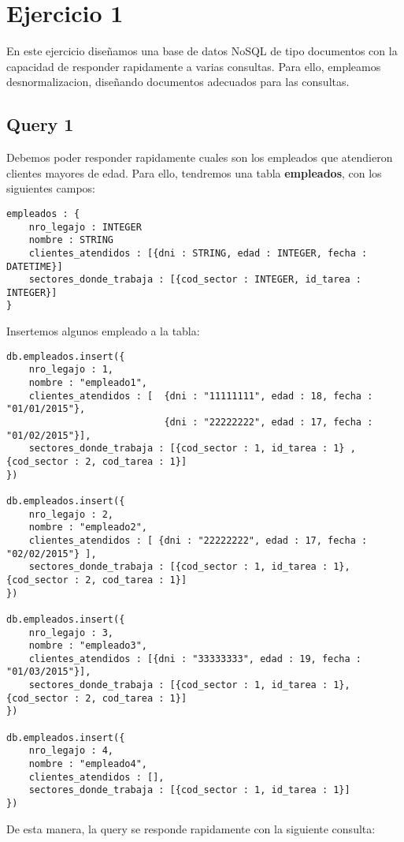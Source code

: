 \section{Ejercicio 1}

En este ejercicio diseñamos una base de datos NoSQL de tipo documentos con la capacidad de responder rapidamente a varias consultas. Para ello, empleamos desnormalizacion, diseñando documentos adecuados para las consultas.

\subsection{Query 1}
Debemos poder responder rapidamente cuales son los empleados que atendieron clientes mayores de edad. Para ello, tendremos una tabla \textbf{empleados}, con los siguientes campos:

\begin{verbatim}
empleados : {
	nro_legajo : INTEGER
	nombre : STRING
	clientes_atendidos : [{dni : STRING, edad : INTEGER, fecha : DATETIME}]
	sectores_donde_trabaja : [{cod_sector : INTEGER, id_tarea : INTEGER}]
}
\end{verbatim}

Insertemos algunos empleado a la tabla:

\begin{verbatim}
db.empleados.insert({
	nro_legajo : 1,
	nombre : "empleado1",
	clientes_atendidos : [	{dni : "11111111", edad : 18, fecha : "01/01/2015"},
							{dni : "22222222", edad : 17, fecha : "01/02/2015"}],
	sectores_donde_trabaja : [{cod_sector : 1, id_tarea : 1} , 	{cod_sector : 2, cod_tarea : 1}]
})

db.empleados.insert({
	nro_legajo : 2,
	nombre : "empleado2",
	clientes_atendidos : [ {dni : "22222222", edad : 17, fecha : "02/02/2015"} ],
	sectores_donde_trabaja : [{cod_sector : 1, id_tarea : 1}, 	{cod_sector : 2, cod_tarea : 1}]
})

db.empleados.insert({
	nro_legajo : 3,
	nombre : "empleado3",
	clientes_atendidos : [{dni : "33333333", edad : 19, fecha : "01/03/2015"}],
	sectores_donde_trabaja : [{cod_sector : 1, id_tarea : 1}, 	{cod_sector : 2, cod_tarea : 1}]
})

db.empleados.insert({
	nro_legajo : 4,
	nombre : "empleado4",
	clientes_atendidos : [],
	sectores_donde_trabaja : [{cod_sector : 1, id_tarea : 1}]
})
\end{verbatim}

De esta manera, la query se responde rapidamente con la siguiente consulta:

